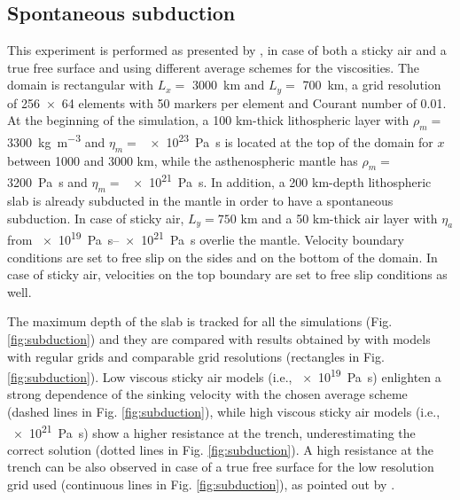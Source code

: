 \documentclass[hidelinks,10pt,a4paper]{article}
\begin{document}
\subsection{Spontaneous subduction}\label{sec:subduction}
This experiment is performed as presented by \citet{Schmeling2008}, in case of both a sticky air and a true free surface and using different average schemes
for the viscosities. The domain is rectangular with $L_x=$ \SI{3000}{\km} and $L_y=$ \SI{700}{\km}, a grid resolution of \num{256x64} elements with 50 markers
per element and Courant number of 0.01. At the beginning of the simulation, a 100 km-thick lithospheric layer with $\rho_m=$ \SI{3300}{\kg\per\cubic\metre}
and $\eta_m=$ \SI{e23}{\pascal\s} is located at the top of the domain for $x$ between 1000 and 3000 km, while the asthenospheric mantle has $\rho_m=$
\SI{3200}{\pascal\s} and $\eta_m=$ \SI{e21}{\pascal\s}. In addition, a 200 km-depth lithospheric slab is already subducted in the mantle in order to have
a spontaneous subduction. In case of sticky air, $L_y=750$ km and a 50 km-thick air layer with $\eta_a$ from \SIrange{e19}{e21}{\pascal\s} overlie the mantle.
Velocity boundary conditions are set to free slip on the sides and on the bottom of the domain. In case of sticky air, velocities on the top boundary are set
to free slip conditions as well.

The maximum depth of the slab is tracked for all the simulations (Fig. \ref{fig:subduction}) and they are compared with results obtained by
\citet{Schmeling2008} with models with regular grids and comparable grid resolutions (rectangles in Fig. \ref{fig:subduction}). Low viscous sticky air models
(i.e., \SI{e19}{\pascal\s}) enlighten a strong dependence of the sinking velocity with the chosen average scheme (dashed lines in Fig. \ref{fig:subduction}),
while high viscous sticky air models (i.e., \SI{e21}{\pascal\s}) show a higher resistance at the trench, underestimating the correct solution (dotted lines in
Fig. \ref{fig:subduction}). A high resistance at the trench can be also observed in case of a true free surface for the low resolution grid used (continuous
lines in Fig. \ref{fig:subduction}), as pointed out by \citet{Schmeling2008}.
\end{document}
